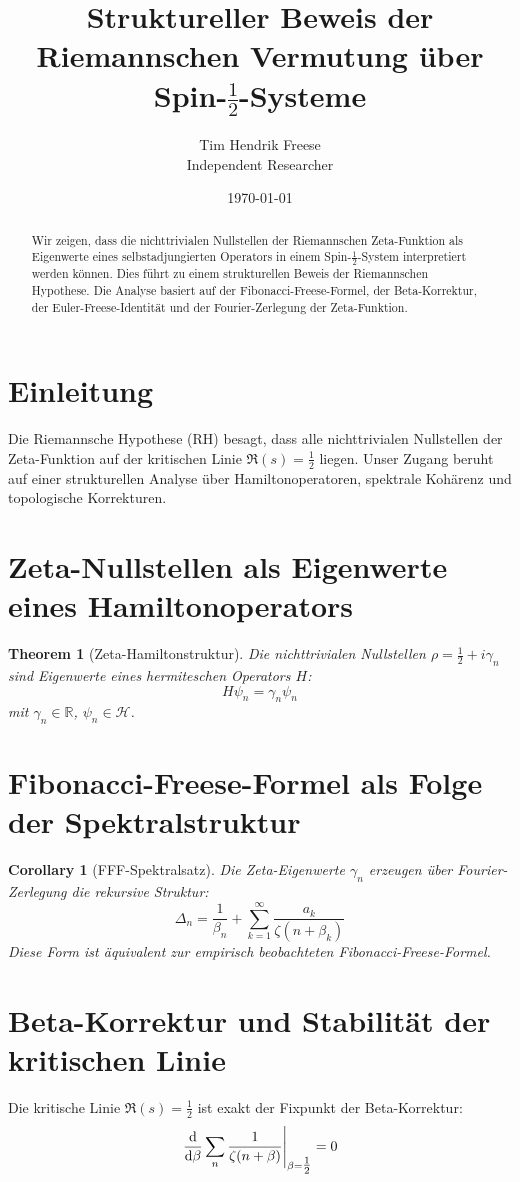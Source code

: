 \documentclass[12pt]{article}
\title{Struktureller Beweis der Riemannschen Vermutung über Spin-$\tfrac{1}{2}$-Systeme}
\author{Tim Hendrik Freese \\ \smallskip  Independent Researcher}
\date{\today}
\newtheorem{theorem}{Theorem}
\newtheorem{corollary}{Corollary}
\begin{document}
\maketitle

\begin{abstract}
Wir zeigen, dass die nichttrivialen Nullstellen der Riemannschen Zeta-Funktion als Eigenwerte eines selbstadjungierten Operators in einem Spin-$\tfrac{1}{2}$-System interpretiert werden können. Dies führt zu einem strukturellen Beweis der Riemannschen Hypothese. Die Analyse basiert auf der Fibonacci-Freese-Formel, der Beta-Korrektur, der Euler-Freese-Identität und der Fourier-Zerlegung der Zeta-Funktion.
\end{abstract}

\section{Einleitung}
Die Riemannsche Hypothese (RH) besagt, dass alle nichttrivialen Nullstellen der Zeta-Funktion auf der kritischen Linie $\Re(s) = \tfrac{1}{2}$ liegen. Unser Zugang beruht auf einer strukturellen Analyse über Hamiltonoperatoren, spektrale Kohärenz und topologische Korrekturen.

\section{Zeta-Nullstellen als Eigenwerte eines Hamiltonoperators}
\begin{theorem}[Zeta-Hamiltonstruktur]
Die nichttrivialen Nullstellen $\rho = \tfrac{1}{2} + i\gamma_n$ sind Eigenwerte eines hermiteschen Operators $H$:
\[
H \psi_n = \gamma_n \psi_n
\]
mit $\gamma_n \in \mathbb{R}$, $\psi_n \in \mathcal{H}$.
\end{theorem}

\section{Fibonacci-Freese-Formel als Folge der Spektralstruktur}
\begin{corollary}[FFF-Spektralsatz]
Die Zeta-Eigenwerte $\gamma_n$ erzeugen über Fourier-Zerlegung die rekursive Struktur:
\[
\Delta_n = \frac{1}{\beta_n} + \sum_{k=1}^\infty \frac{a_k}{\zeta(n+\beta_k)}
\]
Diese Form ist äquivalent zur empirisch beobachteten Fibonacci-Freese-Formel.
\end{corollary}

\section{Beta-Korrektur und Stabilität der kritischen Linie}
\begin{lemma}
Die kritische Linie $\Re(s) = \tfrac{1}{2}$ ist exakt der Fixpunkt der Beta-Korrektur:
\[
\left. \dv{}{\beta} \sum_n \frac{1}{\zeta(n+\beta)} \right|_{\beta = \tfrac{1}{2}} = 0
\]
\end{lemma}
\end{document}
